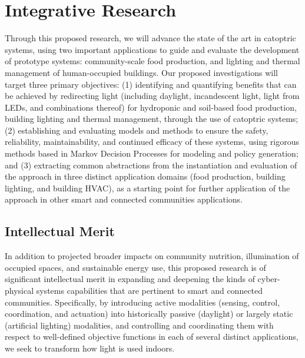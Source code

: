 \section{Integrative Research}
\label{sec:research}


Through this proposed research, we will advance the state of the art in
catoptric systems, using two important applications to guide and evaluate the
development of prototype systems: community-scale food production, and lighting
and thermal management of human-occupied buildings. Our proposed investigations
will target three primary objectives: (1) identifying and quantifying benefits
that can be achieved by redirecting light (including daylight, incandescent
light, light from LEDs, and combinations thereof) for hydroponic and soil-based
food production, building lighting and thermal management, through the use of
catoptric systems; (2) establishing and evaluating models and methods to ensure
the safety, reliability, maintainability, and continued efficacy of these
systems, using rigorous methods based in Markov Decision Processes for modeling
and policy generation; and (3) extracting common abstractions from the
instantiation and evaluation of the approach in three distinct application
domains (food production, building lighting, and building HVAC), as a starting
point for further application of the approach in other smart and connected
communities applications.

\subsection{Intellectual Merit}
\label{sec:im}

In addition to projected broader impacts on community nutrition, illumination
of occupied spaces, and sustainable energy use, this proposed research is of
significant intellectual merit in expanding and deepening the kinds of
cyber-physical systems capabilities that are pertinent to smart and connected
communities. Specifically, by introducing active modalities (sensing, control,
coordination, and actuation) into historically passive (daylight) or largely
static (artificial lighting) modalities, and controlling and coordinating them
with respect to well-defined objective functions in each of several distinct
applications, we seek to transform how light is used indoors.  

